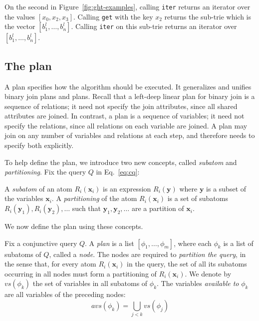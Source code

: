 \begin{example}
  On the second \GHT in Figure~\ref{fig:ght-examples},
  calling \texttt{iter} returns an
  iterator over the values $[x_0, x_2, x_3]$.
  Calling \texttt{get} with the key $x_2$
  returns the sub-trie which is the vector $[b_1^l, \ldots, b_n^l]$.
  Calling \texttt{iter} on this sub-trie
  returns an iterator over $[b_1^l, \ldots, b_n^l]$.
\end{example}


\subsection{The \FJ plan}\label{sec:fj-plan}


A \FJ plan specifies how the \FJ algorithm should be executed.
It generalizes and unifies binary join plans and \GJ plans.
Recall that a left-deep linear plan for binary join
is a sequence of relations;
it need not specify the join attributes,
since all shared attributes are joined.
In contrast, a \GJ plan is a sequence of variables;
it need not specify the relations,
since all relations on each variable are joined.
A \FJ plan may join on any number of variables and relations at each step,
and therefore needs to specify both explicitly.

To help define the \FJ plan, we introduce two new concepts, called
\emph{subatom} and \emph{partitioning}.  Fix the query $Q$ in
Eq.~\eqref{eq:cq}:

\begin{definition}
  A \emph{subatom} of an atom $R_i(\bm x_i)$ is an expression
  $R_i(\bm y)$ where $\bm y$ is a subset of the variables $\bm x_i$.
  A \emph{partitioning} of the atom $R_i(\bm x_i)$ is a set of
  subatoms $R_i(\bm y_1), R_i(\bm y_2), \ldots$ such that
  $\bm y_1, \bm y_2, \ldots$ are a partition of $\bm x_i$.
\end{definition}

We now define the \FJ plan using these concepts.

\begin{definition}[\FJ Plan]
  Fix a conjunctive query $Q$.  A \FJ \emph{plan} is a list
  $[\phi_1, \ldots, \phi_m]$, where each $\phi_k$ is a list of
  subatoms of $Q$, called a {\em node}.  The nodes are required to
    {\em partition the query}, in the sense that, for every atom
  $R_i(\bm x_i)$ in the query, the set of all its subatoms occurring
  in all nodes must form a partitioning of $R_i(\bm x_i)$.  We denote
  by $vs(\phi_k)$ the set of variables in all subatoms of $\phi_k$.
  The variables \emph{available to} $\phi_k$ are all variables of the
  preceding nodes:
  $$avs(\phi_k) = \bigcup_{j < k} vs(\phi_j)$$
\end{definition}

